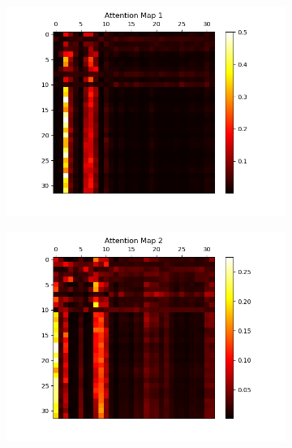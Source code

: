 \documentclass[10pt]{article}
\theoremstyle{definition}
\begin{document}
\begin{figure}[H]
    \centering
    \begin{subfigure}[b]{0.35\textwidth}
        \centering
        \includegraphics[scale=0.4]{../data/plots/part1/attention_map_1.png}
        \label{subfig:am1}
    \end{subfigure}
    \begin{subfigure}[b]{0.35\textwidth}
        \centering
        \includegraphics[scale=0.4]{../data/plots/part1/attention_map_2.png}
        \label{subfig:am2}
    \end{subfigure}
    \begin{subfigure}[b]{0.35\textwidth}
        \centering

\end{subfigure}
\end{figure}
\end{document}
